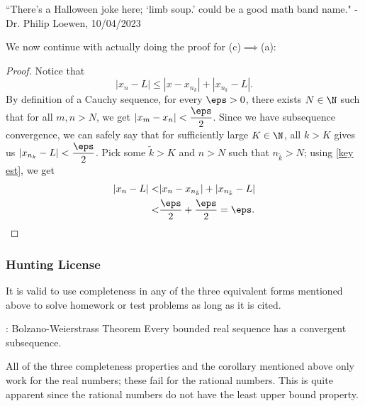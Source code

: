 \begin{nquote}{}
	``There's a Halloween joke here; `limb soup.' could be a good math band name." - Dr. Philip Loewen, 10/04/2023
\end{nquote}

We now continue with actually doing the proof for (c)\(\implies\)(a):
\begin{proof}
	Notice that 
	\begin{equation}
		|x_n-L|\leq |x-x_{n_k}|+|x_{n_k}-L|.\label{key est}
	\end{equation}
	By definition of a Cauchy sequence, for every \(\eps>0\), there exists \(N\in\N\) such that for all \(m,n>N\), we get \(|x_m-x_n|<\displaystyle\frac{\eps}{2}\). Since we have subsequence convergence, we can safely say that for sufficiently large \(K\in\N\), all \(k>K\) gives us \(|x_{n_k}-L|<\displaystyle\frac{\eps}{2}\). Pick some \(\tilde{k}>K\) and \(n>N\) such that \(n_{\tilde{k}}>N\); using \cref{key est}, we get 
	\begin{align*}
		|x_n-L|<&|x_n-x_{n_{\tilde{k}}}|+|x_{n_{\tilde{k}}}-L|\\
			   <&\frac{\eps}{2}+\frac{\eps}{2}=\eps.
	\end{align*}
\end{proof}

\subsubsection*{Hunting License}
It is valid to use completeness in any of the three equivalent forms mentioned above to solve homework or test problems as long as it is cited.

\begin{ncorollary}{: Bolzano-Weierstrass Theorem}
	Every bounded real sequence has a convergent subsequence.
\end{ncorollary}
\begin{note}
	All of the three completeness properties and the corollary mentioned above only work for the real numbers; these fail for the rational numbers. This is quite apparent since the rational numbers do not have the least upper bound property.
\end{note}

